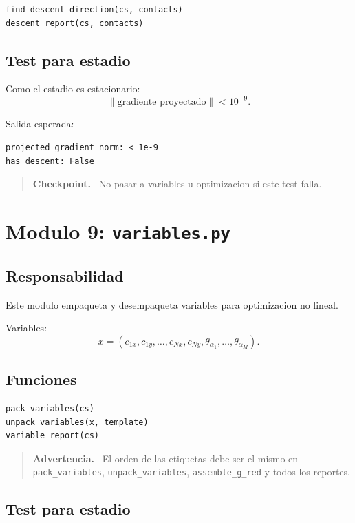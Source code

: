 \documentclass[11pt,letterpaper]{amsart}
\newenvironment{checkpoint}
{\par\medskip\noindent\begin{quote}\textbf{Checkpoint.}\ }
{\end{quote}\par\medskip}
\newenvironment{warningbox}
{\par\medskip\noindent\begin{quote}\textbf{Advertencia.}\ }
{\end{quote}\par\medskip}
\begin{document}
\begin{verbatim}
find_descent_direction(cs, contacts)
descent_report(cs, contacts)
\end{verbatim}

\subsection{Test para estadio}

Como el estadio es estacionario:
\[
\|\text{gradiente proyectado}\|<10^{-9}.
\]

Salida esperada:
\begin{verbatim}
projected gradient norm: < 1e-9
has descent: False
\end{verbatim}

\begin{checkpoint}
No pasar a variables u optimizacion si este test falla.
\end{checkpoint}

\section{Modulo 9: \texttt{variables.py}}

\subsection{Responsabilidad}

Este modulo empaqueta y desempaqueta variables para optimizacion no lineal.

Variables:
\[
x=(c_{1x},c_{1y},\ldots,c_{Nx},c_{Ny},
\theta_{\alpha_1},\ldots,\theta_{\alpha_M}).
\]

\subsection{Funciones}

\begin{verbatim}
pack_variables(cs)
unpack_variables(x, template)
variable_report(cs)
\end{verbatim}

\begin{warningbox}
El orden de las etiquetas debe ser el mismo en \texttt{pack\_variables},
\texttt{unpack\_variables}, \texttt{assemble\_g\_red} y todos los reportes.
\end{warningbox}

\subsection{Test para estadio}
\end{document}
